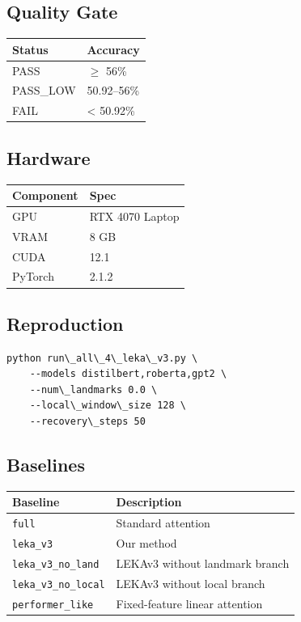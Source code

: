 \subsection{Quality Gate}

\begin{table}[H]
\centering
\small
\begin{tabular}{ll}
\toprule
\textbf{Status} & \textbf{Accuracy} \\
\midrule
PASS & $\ge$ 56\% \\
PASS\_LOW & 50.92--56\% \\
FAIL & \textless{} 50.92\% \\
\bottomrule
\end{tabular}
\end{table}

\subsection{Hardware}

\begin{table}[H]
\centering
\small
\begin{tabular}{ll}
\toprule
\textbf{Component} & \textbf{Spec} \\
\midrule
GPU & RTX 4070 Laptop \\
VRAM & 8 GB \\
CUDA & 12.1 \\
PyTorch & 2.1.2 \\
\bottomrule
\end{tabular}
\end{table}

\subsection{Reproduction}

\begin{lstlisting}
python run\_all\_4\_leka\_v3.py \
    --models distilbert,roberta,gpt2 \
    --num\_landmarks 0.0 \
    --local\_window\_size 128 \
    --recovery\_steps 50
\end{lstlisting}

\subsection{Baselines}

\begin{table}[H]
\centering
\small
\begin{tabular}{ll}
\toprule
\textbf{Baseline} & \textbf{Description} \\
\midrule
\texttt{full} & Standard attention \\
\texttt{leka\_v3} & Our method \\
\texttt{leka\_v3\_no\_land} & LEKAv3 without landmark branch \\
\texttt{leka\_v3\_no\_local} & LEKAv3 without local branch \\
\texttt{performer\_like} & Fixed-feature linear attention \\
\bottomrule
\end{tabular}
\end{table}


